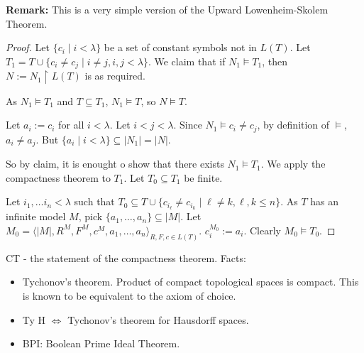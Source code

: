 \documentclass{report}
\begin{document}


\noindent \textbf{Remark:} This is a very simple version of the Upward Lowenheim-Skolem Theorem.
\begin{proof}
    Let $\{ c_i \mid i < \lambda\}$ be a set of constant symbols not in $L(T)$. Let $T_1 = T \cup \{c_i \neq c_j \mid i \neq j, i,j < \lambda\}$. We claim that if $N_1 \models T_1$, then $N := N_1 \restriction L(T)$ is as required.

    As $N_1 \models T_1$ and $T \subseteq T_1$, $N_1 \models T$, so $N \models T$.

    Let $a_i := c_i$ for all $i < \lambda$. Let $i < j < \lambda$. Since $N_1 \models c_i \neq c_j$, by definition of $\models$, $a_i \neq a_j$. But $\{a_i \mid i < \lambda\} \subseteq |N_1| = |N|$. 

    So by claim, it is enought o show that there exists $N_1 \models T_1$. We apply the compactness theorem to $T_1$. Let $T_0 \subseteq T_1$ be finite.
    
    Let $i_1, \ldots i_n < \lambda$ such that $T_0 \subseteq T \cup \{c_{i_\ell} \neq c_{i_k} \mid \ell \neq k, \ell, k \leq n\}$. As $T$ has an infinite model $M$, pick $\{a_1, \ldots, a_n \} \subseteq |M|$. Let $M_0 = \langle |M|, R^M, F^M, c^M, a_1, \ldots, a_n \rangle_{R, F, c \in L(T)}$. $c_i^{M_0} := a_i$. Clearly $M_0 \models T_0$.
\end{proof}

\noindent CT - the statement of the compactness theorem. Facts:
\begin{itemize}
    \item Tychonov's theorem. Product of compact topological spaces is compact. This is known to be equivalent to the axiom of choice.
    \item Ty H $\iff$ Tychonov's theorem for Hausdorff spaces.
    \item BPI: Boolean Prime Ideal Theorem. 
\end{itemize}
\end{document}

